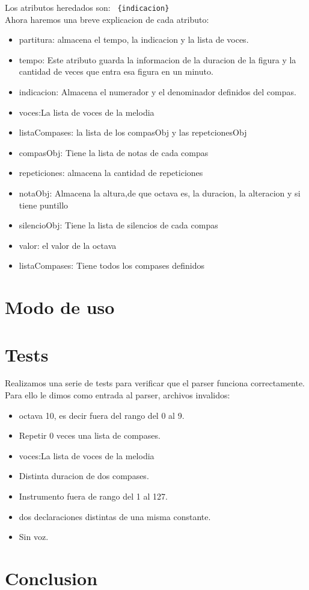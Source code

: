 \documentclass[a4paper]{article}
\begin{document}
Los atributos heredados son: 
\texttt{
\{indicacion\}
}\\  

Ahora haremos una breve explicacion de cada atributo:

\begin{itemize}
\item partitura: almacena el tempo, la indicacion y la lista de voces. 
\item tempo: Este atributo guarda la informacion de la duracion de la figura y la cantidad de veces que entra esa figura en un minuto.
\item indicacion: Almacena el numerador y el denominador definidos del compas.
\item voces:La lista de voces de la melodia
\item listaCompases: la lista de los compasObj y las repetcionesObj
\item compasObj: Tiene la lista de notas  de cada compas
\item repeticiones: almacena la cantidad de repeticiones
\item notaObj: Almacena la altura,de que octava es, la duracion, la alteracion y si tiene puntillo
\item silencioObj: Tiene la lista de silencios de cada compas
\item valor: el valor de la octava 
\item listaCompases: Tiene todos los compases definidos

\end{itemize}

\section{Modo de uso}

\section{Tests}

Realizamos una serie de tests para verificar que el parser funciona correctamente. Para ello le dimos como entrada al parser, archivos invalidos:

\begin{itemize}

\item octava 10, es decir fuera del rango del 0 al 9.
\item Repetir 0 veces una lista de compases.
\item voces:La lista de voces de la melodia
\item Distinta duracion de dos compases.
\item Instrumento fuera de rango del 1 al 127.
\item dos declaraciones distintas de una misma constante.
\item Sin voz.

\end{itemize}


\section{Conclusion}
\end{document}
